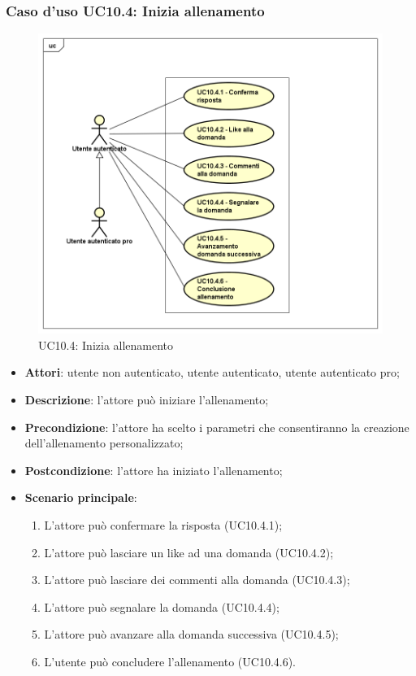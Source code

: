 \subsubsection{Caso d'uso UC10.4: Inizia allenamento}
\label{UC10.4}
\begin{figure}
	\centering
	\includegraphics[scale=0.5]{UML/UC10_4.png}
	\caption{UC10.4: Inizia allenamento}
\end{figure}
\FloatBarrier
	\begin{itemize}
		\item \textbf{Attori}: utente non autenticato, utente autenticato, utente autenticato pro;
		\item \textbf{Descrizione}: l'attore può iniziare l'allenamento;
		\item \textbf{Precondizione}: l'attore ha scelto i parametri che consentiranno la creazione dell'allenamento personalizzato;
		\item \textbf{Postcondizione}: l'attore ha iniziato l'allenamento;
		\item \textbf{Scenario principale}: 
			\begin{enumerate}
				\item L'attore può confermare la risposta (UC10.4.1);
				\item L'attore può lasciare un like ad una domanda (UC10.4.2);
				\item L'attore può lasciare dei commenti alla domanda (UC10.4.3);
				\item L'attore può segnalare la domanda (UC10.4.4);
				\item L'attore può avanzare alla domanda successiva (UC10.4.5);
				\item L'utente può concludere l'allenamento (UC10.4.6).
			\end{enumerate}	
	\end{itemize}
	
